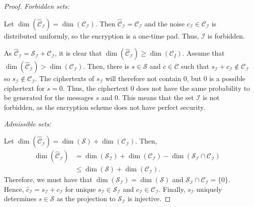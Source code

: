 \documentclass[../main.tex]{subfiles}
\begin{document}
\begin{proof} \emph{Forbidden sets:}

\ProofLeftarrow Let $\dim(\hat{\mathcal{C}}_\mathcal{I}) = \dim(\mathcal{C}_\mathcal{I})$. Then $\hat{\mathcal{C}}_\mathcal{I} = \mathcal{C}_\mathcal{I}$ and the noise $c_\mathcal{I} \in \mathcal{C}_\mathcal{I}$ is distributed uniformly, so the encryption is a one-time pad. Thus, $\mathcal{I}$ is forbidden.

\ProofRightarrow As $\hat{\mathcal{C}}_\mathcal{I} = \mathcal{S}_\mathcal{I} + \mathcal{C}_\mathcal{I}$, it is clear that $\dim(\hat{\mathcal{C}}_\mathcal{I}) \geq \dim(\mathcal{C}_I)$. Assume that $\dim(\hat{\mathcal{C}}_\mathcal{I}) > \dim(\mathcal{C}_\mathcal{I})$. Then, there is $s \in \mathcal{S}$ and $c \in \mathcal{C}$ such that $s_\mathcal{I} + c_\mathcal{I} \notin \mathcal{C}_\mathcal{I}$ so $s_\mathcal{I} \notin \mathcal{C}_\mathcal{I}$. The ciphertexts of $s_\mathcal{I}$ will therefore not contain $0$, but $0$ is a possible ciphertext for $s = 0$. Thus, the ciphertext $0$ does not have the same probability to be generated for the messages $s$ and $0$. This means that the set $\mathcal{I}$ is not forbidden, as the encryption scheme does not have perfect security.

\emph{Admissible sets:}

\ProofLeftarrow Let $\dim(\hat{\mathcal{C}}_\mathcal{I}) = \dim(\mathcal{S}) + \dim(\mathcal{C}_\mathcal{I})$. Then,
\begin{align*}
    \dim(\hat{\mathcal{C}}_\mathcal{I}) &= \dim(\mathcal{S}_\mathcal{I}) + \dim(\mathcal{C}_\mathcal{I}) - \dim(\mathcal{S}_\mathcal{I} \cap \mathcal{C}_\mathcal{I}) \\
    &\leq \dim(\mathcal{S}) + \dim(\mathcal{C}_\mathcal{I}).
\end{align*}
Therefore, we must have that $\dim(\mathcal{S}_\mathcal{I}) = \dim(\mathcal{S})$ and $\mathcal{S}_\mathcal{I} \cap \mathcal{C}_\mathcal{I} = \{0\}$. Hence, $\hat{c}_\mathcal{I} = s_\mathcal{I} + c_\mathcal{I}$ for unique $s_\mathcal{I} \in \mathcal{S}_\mathcal{I}$ and $c_\mathcal{I} \in \mathcal{C}_\mathcal{I}$. Finally, $s_\mathcal{I}$ uniquely determines $s \in \mathcal{S}$ as the projection to $\mathcal{S}_\mathcal{I}$ is injective.


\end{proof}
\end{document}
